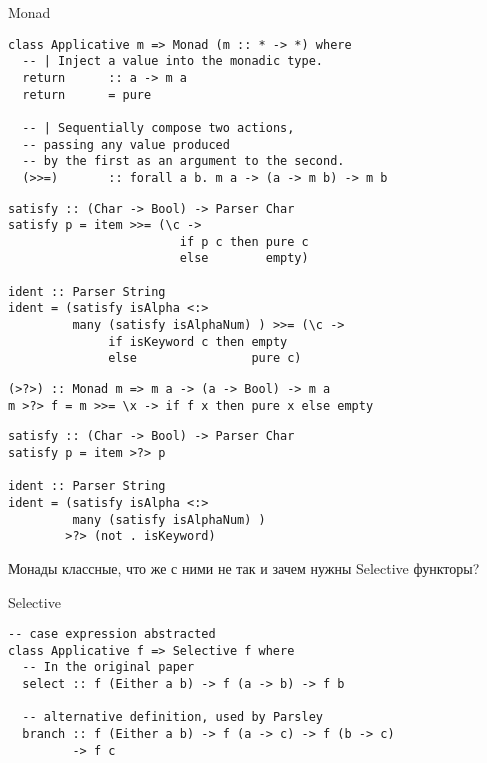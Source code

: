 
\begin{frame}[fragile]{Monad}
\begin{verbatim}
class Applicative m => Monad (m :: * -> *) where
  -- | Inject a value into the monadic type.
  return      :: a -> m a
  return      = pure
  
  -- | Sequentially compose two actions, 
  -- passing any value produced
  -- by the first as an argument to the second.
  (>>=)       :: forall a b. m a -> (a -> m b) -> m b
\end{verbatim}
\end{frame}


\begin{frame}[fragile]
\begin{verbatim}
satisfy :: (Char -> Bool) -> Parser Char 
satisfy p = item >>= (\c -> 
                        if p c then pure c 
                        else        empty)
  
ident :: Parser String 
ident = (satisfy isAlpha <:> 
         many (satisfy isAlphaNum) ) >>= (\c -> 
              if isKeyword c then empty
              else                pure c)
\end{verbatim}
\end{frame}

\begin{frame}[fragile]
\begin{verbatim}
(>?>) :: Monad m => m a -> (a -> Bool) -> m a
m >?> f = m >>= \x -> if f x then pure x else empty
\end{verbatim}
\newln

\begin{verbatim}
satisfy :: (Char -> Bool) -> Parser Char 
satisfy p = item >?> p
  
ident :: Parser String 
ident = (satisfy isAlpha <:> 
         many (satisfy isAlphaNum) ) 
        >?> (not . isKeyword)
\end{verbatim}
\end{frame}



\begin{frame}
\begin{center}
\Large
Монады классные, что же с ними не так и зачем нужны Selective функторы?
\end{center}
\end{frame}

\begin{frame}[fragile]{Selective}
\begin{verbatim}
-- case expression abstracted
class Applicative f => Selective f where
  -- In the original paper 
  select :: f (Either a b) -> f (a -> b) -> f b
  
  -- alternative definition, used by Parsley
  branch :: f (Either a b) -> f (a -> c) -> f (b -> c) 
         -> f c
\end{verbatim}
\end{frame}



